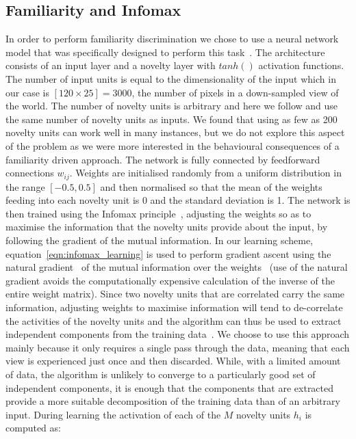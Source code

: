\documentclass[letterpaper]{article}
\begin{document}
\subsection{Familiarity and Infomax}
\label{sec:familiarity_infomax}
In order to perform familiarity discrimination we chose to use a neural network model that was specifically designed to perform this task~\citep{Lulham2011}. 
The architecture consists of an input layer and a novelty layer with $tanh()$ activation functions. 
The number of input units is equal to the dimensionality of the input which in our case is $[120 \times 25]=3000$, the number of pixels in a down-sampled view of the world. 
The number of novelty units is arbitrary and here we follow \citet{Lulham2011} and use the same number of novelty units as inputs. 
We found that using as few as \num{200} novelty units can work well in many instances, but we do not explore this aspect of the problem as we were more interested in the behavioural consequences of a familiarity driven approach. 
The network is fully connected by feedforward connections $w_{ij}$. 
Weights are initialised randomly from a uniform distribution in the range $[-0.5,0.5]$ and then normalised so that the mean of the weights feeding into each novelty unit is \num{0} and the standard deviation is \num{1}. 
The network is then trained using the Infomax principle~\citep{Bell1995}, adjusting the weights so as to maximise the information that the novelty units provide about the input, by following the gradient of the mutual information. 
In our learning scheme, equation~\ref{eqn:infomax_learning} is used to perform gradient ascent using the natural gradient~\citep{Amari1998} of the mutual information over the weights~\citep{Lee1997} (use of the natural gradient avoids the computationally expensive calculation of the inverse of the entire weight matrix). 
Since two novelty units that are correlated carry the same information, adjusting weights to maximise information will tend to de-correlate the activities of the novelty units and the algorithm can thus be used to extract independent components from the training data~\citep{Lee1997}. 
We choose to use this approach mainly because it only requires a single pass through the data, meaning that each view is experienced just once and then discarded. 
While, with a limited amount of data, the algorithm is unlikely to converge to a particularly good set of independent components, it is enough that the components that are extracted provide a more suitable decomposition of the training data than of an arbitrary input.
During learning the activation of each of the $M$ novelty units $h_{i}$ is computed as:
\end{document}
